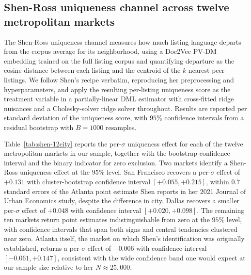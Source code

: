 
\subsection{Shen-Ross uniqueness channel across twelve metropolitan markets}
\label{sec:shen-12city}

The Shen-Ross uniqueness channel \citep{shen2021information} measures
how much listing language departs from the corpus average for its
neighborhood, using a Doc2Vec PV-DM embedding trained on the full
listing corpus and quantifying departure as the cosine distance
between each listing and the centroid of the $k$ nearest peer
listings. We follow Shen's recipe verbatim, reproducing her
preprocessing and hyperparameters, and apply the resulting per-listing
uniqueness score as the treatment variable in a partially-linear DML
estimator with cross-fitted ridge nuisances and a Cholesky-solver
ridge solver throughout. Results are reported per standard
deviation of the uniqueness score, with $95\%$ confidence intervals
from a residual bootstrap with $B = 1000$ resamples.

Table~\ref{tab:shen-12city} reports the per-$\sigma$ uniqueness effect
for each of the twelve metropolitan markets in our sample, together
with the bootstrap confidence interval and the binary indicator for
zero exclusion. Two markets identify a Shen-Ross uniqueness effect at
the $95\%$ level. San Francisco recovers a per-$\sigma$ effect of
$+0.131$ with cluster-bootstrap confidence interval
$[+0.055, +0.215]$, within $0.7$ standard errors of the
Atlanta point estimate Shen reports in her 2021 Journal of Urban
Economics study, despite the difference in city. Dallas recovers a
smaller per-$\sigma$ effect of $+0.048$ with confidence interval
$[+0.020, +0.098]$. The remaining ten markets return point estimates
indistinguishable from zero at the $95\%$ level, with confidence
intervals that span both signs and central tendencies clustered near
zero. Atlanta itself, the market on which Shen's identification was
originally established, returns a per-$\sigma$ effect of $-0.006$
with confidence interval $[-0.061, +0.147]$, consistent with the wide
confidence band one would expect at our sample size relative to her
$N \approx 25{,}000$.

